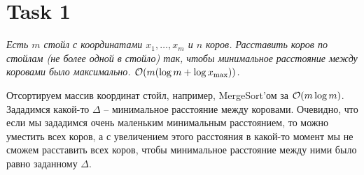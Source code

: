 \section{Task 1}
\begin{task}
    \textit{Есть $m$ стойл с координатами $x_1, \ldots, x_m$ и $n$ коров. Расставить коров по стойлам
	(не более одной в стойло) так, чтобы минимальное расстояние между коровами было максимально.
	$\mathcal{O}(m (\log{m} + \log{x_{\max}}))$.}
\end{task}
\begin{solution}
Отсортируем массив координат стойл, например, MergeSort'ом за $\mathcal{O}(m\log m)$.
Зададимся какой-то $\Delta$ -- минимальное расстояние между коровами.
Очевидно, что если мы зададимся очень маленьким минимальным расстоянием, то можно уместить всех коров, а с увеличением этого расстояния в какой-то момент мы не сможем расставить всех коров, чтобы минимальное расстояние между ними было равно заданному $\Delta$.


\end{solution}

